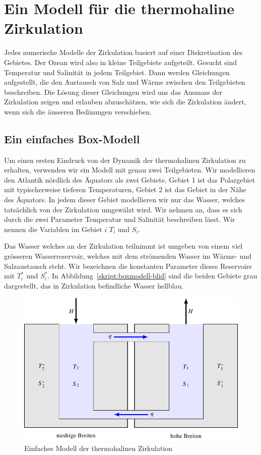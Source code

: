%
%
%
\section{Ein Modell für die thermohaline Zirkulation}
Jedes numerische Modelle der Zirkulation basiert auf einer Diskretisation
des Gebietes.
Der Ozean wird also in kleine Teilgebiete aufgeteilt.
Gesucht sind Temperatur und Salinität in jedem Teilgebiet.
Dann werden Gleichungen aufgestellt, die den Austausch von Salz und
Wärme zwischen den Teilgebieten beschreiben.
Die Lösung dieser Gleichungen wird uns das Ausmass der Zirkulation zeigen
und erlauben abzuschätzen, wie sich die Zirkulation ändert, wenn sich
die äusseren Bedinungen verschieben.

\subsection{Ein einfaches Box-Modell}
Um einen ersten Eindruck von der Dynamik der thermohalinen Zirkulation
zu erhalten, verwenden wir ein Modell mit genau zwei Teilgebieten.
Wir modellieren den Atlantik nördlich des Äquators als zwei Gebiete.
Gebiet 1 ist das Polargebiet mit typischerweise tieferen Temperaturen,
Gebiet 2 ist das Gebiet in der Nähe des Äquators.
In jedem dieser Gebiet modellieren wir nur das Wasser, welches tatsächlich
von der Zirkulation umgewälzt wird.
Wir nehmen an, dass es sich durch die zwei Parameter Temperatur und
Salinität beschreiben lässt.
Wir nennen die Variablen im Gebiet $i$ $T_i$ und $S_i$.

Das Wasser welches an der Zirkulation teilnimmt ist umgeben von einem
viel grösseren Wasserreservoir, welches mit dem strömenden Wasser 
im Wärme- und Salzaustausch steht.
Wir bezeichnen die konstanten Parameter dieses Reservoirs mit
$T_i^*$ und $S_i^*$.
In Abbildung~\ref{skript:boxmodell-blid} sind die beiden Gebiete
grau dargestellt, das in Zirkulation befindliche Wasser hellblau.
\begin{figure}
\centering
\includegraphics{chapters/4/boxmodell.pdf}
\caption{Einfaches Modell der thermohalinen Zirkulation
\label{skript:boxmodell-bild}}
\end{figure}

